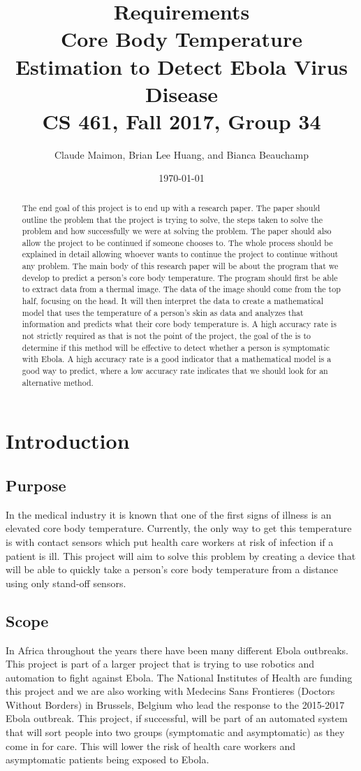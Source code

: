 \documentclass[onecolumn, draftclsnofoot,10pt, compsoc]{IEEEtran}
\title{%
  Requirements \\
  \vspace{0.4cm}
  \large Core Body Temperature Estimation to Detect Ebola Virus Disease \\
  \vspace{0.4cm}
  \large CS 461, Fall 2017, Group 34\\
    }
\author{Claude Maimon, Brian Lee Huang, and Bianca Beauchamp}
\date{\today}
\begin{document}
\maketitle

\begin{abstract}
	The end goal of this project is to end up with a research paper. The paper should outline the problem that the project is trying to solve, the steps taken to solve the problem and how successfully we were
	at solving the problem. The paper should also allow the project to be continued if someone chooses to. The whole process should be explained in detail allowing whoever wants to continue the
	project to continue without any problem. The main body of this research paper will be about the program that we develop to predict a person's core body temperature. The program should first be able to
	extract data from a thermal image. The data of the image should come from the top half, focusing on the head. It will then interpret the data to create a mathematical model that uses the temperature of a 
	person's skin as data and analyzes that information and predicts what their core body temperature is. A high accuracy rate is not strictly required as that is not the point of the project, 
	the goal of the is to determine if this method will be effective to detect whether a person is symptomatic with Ebola. A high accuracy rate is a good indicator that a mathematical model
	is a good way to predict, where a low accuracy rate indicates that we should look for an alternative method.
\end{abstract}

\newpage

\tableofcontents
\newpage
\section{Introduction}
	\subsection{Purpose}
	    In the medical industry it is known that one of the first signs of illness is an elevated core body temperature. Currently, the only way to get this temperature is with contact sensors which put health care workers at risk of infection if a patient is ill. This project will aim to solve this problem by creating a device that will be able to quickly take a person's core body temperature from a distance using only stand-off sensors.
	\subsection{Scope}
	    In Africa throughout the years there have been many different Ebola outbreaks. This project is part of a larger project that is trying to use robotics and automation to fight against Ebola. The National Institutes of Health are funding this project and we are also working with Medecins Sans Frontieres (Doctors Without Borders) in Brussels, Belgium who lead the response to the 2015-2017 Ebola outbreak. 
        This project, if successful, will be part of an automated system that will sort people into two groups (symptomatic and asymptomatic) as they come in for care. This will lower the risk of health care workers and asymptomatic patients being exposed to Ebola. 
\end{document}
